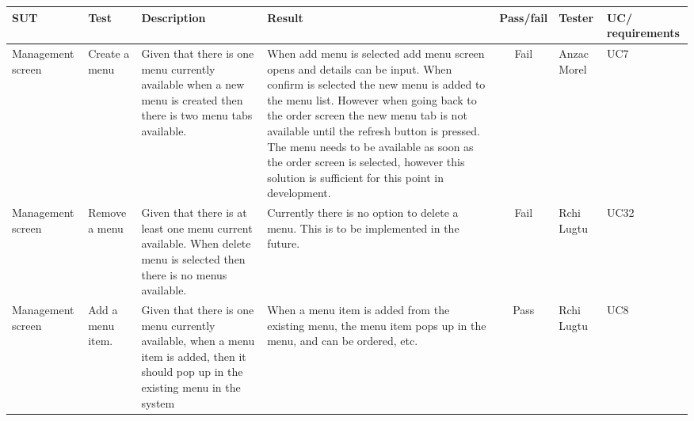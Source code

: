 \begin{tabularx}{\linewidth}{|X|X|X|X|c|X|X|}
\hline
SUT & Test & Description & Result & Pass/fail & Tester & UC/ requirements \\
\hline
Management screen & Create a menu & Given that there is one menu currently available when a new menu is created then there is two menu tabs available. & When add menu is selected add menu screen opens and details can be input. When confirm is selected the new menu is added to the menu list. However when going back to the order screen the new menu tab is not available until the refresh button is pressed. The menu needs to be available as soon as the order screen is selected, however this solution is sufficient for this point in development. & Fail & Anzac Morel & UC7 \\
\hline
Management screen & Remove a menu & Given that there is at least one menu current available. When delete menu is selected then there is no menus available. & Currently there is no option to delete a menu. This is to be implemented in the future. & Fail & Rchi Lugtu & UC32 \\
\hline
Management screen & Add a menu item. & Given that there is one menu currently available, when a menu item is added, then it should pop up in the existing menu in the system & When a menu item is added from the existing menu, the menu item pops up in the menu, and can be ordered, etc. & Pass & Rchi Lugtu & UC8 \\
\hline
\end{tabularx}
